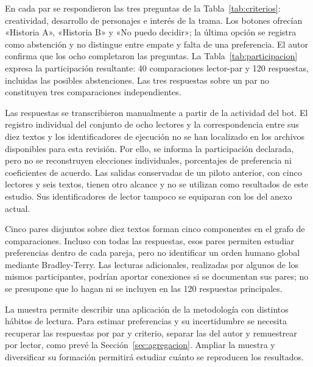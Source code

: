 En cada par se respondieron las tres preguntas de la Tabla~\ref{tab:criterios}: creatividad,
desarrollo de personajes e interés de la trama. Los botones ofrecían «Historia A», «Historia B» y
«No puedo decidir»; la última opción se registra como abstención y no distingue entre empate y
falta de una preferencia. El autor confirma que los ocho completaron las preguntas. La
Tabla~\ref{tab:participacion} expresa la participación resultante: 40 comparaciones lector-par y
120 respuestas, incluidas las posibles abstenciones. Las tres respuestas sobre un par no constituyen
tres comparaciones independientes.

\begin{table}[htb]
  \centering
  \caption{Participación declarada del estudio (octubre--1 de noviembre de 2026)}
  \label{tab:participacion}
  \small
  
\end{table}

Las respuestas se transcribieron manualmente a partir de la actividad del bot. El registro
individual del conjunto de ocho lectores y la correspondencia entre sus diez textos y los
identificadores de ejecución no se han localizado en los archivos disponibles para esta revisión.
Por ello, se informa la participación declarada, pero no se reconstruyen elecciones individuales,
porcentajes de preferencia ni coeficientes de acuerdo. Las salidas conservadas de un piloto anterior,
con cinco lectores y seis textos, tienen otro alcance y no se utilizan como resultados de este
estudio. Sus identificadores de lector tampoco se equiparan con los del anexo actual.

Cinco pares disjuntos sobre diez textos forman cinco componentes en el grafo de comparaciones.
Incluso con todas las respuestas, esos pares permiten estudiar preferencias dentro de cada pareja,
pero no identificar un orden humano global mediante Bradley-Terry. Las lecturas adicionales,
realizadas por algunos de los mismos participantes, podrían aportar conexiones si se documentan sus
pares; no se presupone que lo hagan ni se incluyen en las 120 respuestas principales.

La muestra permite describir una aplicación de la metodología con distintos hábitos de lectura.
Para estimar preferencias y su incertidumbre se necesita recuperar las respuestas por par y criterio,
separar las del autor y remuestrear por lector, como prevé la Sección~\ref{sec:agregacion}.
Ampliar la muestra y diversificar su formación permitirá estudiar cuánto se reproducen los resultados.

